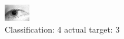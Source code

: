 \begin{figure}[h!]
\begin{center}
\includegraphics[width=0.60\columnwidth]{figures/ID1304_class_4_target_3.png}
\end{center}
\caption{ Classification: 4 actual target: 3}
\label{fig:ID1304_class_4_target_3}
\end{figure}
